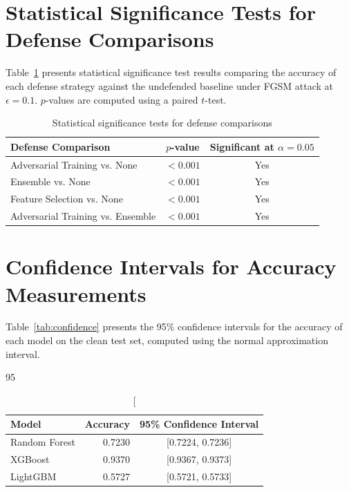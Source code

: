 \documentclass[12pt,a4paper,oneside]{report}
\begin{document}
\begin{appendices}
\section{Statistical Significance Tests for Defense Comparisons}

Table~\ref{tab:significance} presents statistical significance test results comparing the accuracy of each defense strategy against the undefended baseline under FGSM attack at $\epsilon = 0.1$. $p$-values are computed using a paired $t$-test.

\begin{table}[H]
    \centering
    \caption[Statistical significance tests]{Statistical significance tests for defense comparisons}\label{tab:significance}
    \begin{tabular}{lcc}
        \toprule
        Defense Comparison & $p$-value & Significant at $\alpha = 0.05$ \\
        \midrule
        Adversarial Training vs. None & $<0.001$ & Yes \\
        Ensemble vs. None             & $<0.001$ & Yes \\
        Feature Selection vs. None    & $<0.001$ & Yes \\
        Adversarial Training vs. Ensemble & $<0.001$ & Yes \\
        \bottomrule
    \end{tabular}
\end{table}

\section{Confidence Intervals for Accuracy Measurements}

Table~\ref{tab:confidence} presents the 95\% confidence intervals for the accuracy of each model on the clean test set, computed using the normal approximation interval.

\begin{table}[H]
    \centering
    \caption[95%
    \begin{tabular}{lrc}
        \toprule
        Model & Accuracy & 95\% Confidence Interval \\
        \midrule
        Random Forest & 0.7230 & [0.7224, 0.7236] \\
        XGBoost       & 0.9370 & [0.9367, 0.9373] \\
        LightGBM      & 0.5727 & [0.5721, 0.5733] \\
        \bottomrule
    \end{tabular}
\end{table}


\end{appendices}
\end{document}
